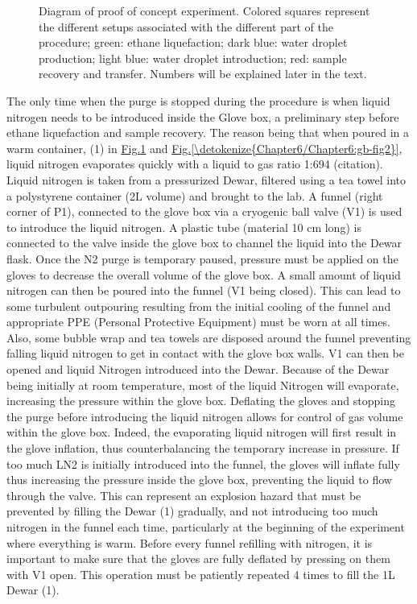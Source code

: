 \documentclass[letterpaper,10pt,english]{jupyterBook}
\begin{document}
\begin{figure}[htbp]
\centering
\capstart

\noindent{}
\caption{Diagram of proof of concept experiment. Colored squares represent the different setups associated with the different part of the procedure; green: ethane liquefaction; dark blue: water droplet production; light blue: water droplet introduction; red: sample recovery and transfer. Numbers will be explained later in the text.}\label{\detokenize{Chapter6/Chapter6:gb-fig1}}\end{figure}

\sphinxAtStartPar
The only time when the purge is stopped during the procedure is when liquid nitrogen needs to be introduced inside the Glove box, a preliminary step before ethane liquefaction and sample recovery. The reason being that when poured in a warm container, (1) in \hyperref[\detokenize{Chapter6/Chapter6:gb-fig1}]{Fig.\@ \ref{\detokenize{Chapter6/Chapter6:gb-fig1}}} and \hyperref[\detokenize{Chapter6/Chapter6:gb-fig2}]{Fig.\@ \ref{\detokenize{Chapter6/Chapter6:gb-fig2}}}, liquid nitrogen evaporates quickly with a liquid to gas ratio 1:694 (citation).
Liquid nitrogen is taken from a pressurized Dewar, filtered using a tea towel into a polystyrene container (2L volume) and brought to the lab. A funnel (right corner of P1), connected to the glove box via a cryogenic ball valve (V1) is used to introduce the liquid nitrogen. A plastic tube (material 10 cm long) is connected to the valve inside the glove box to channel the liquid into the Dewar flask.
Once the N2 purge is temporary paused, pressure must be applied on the gloves to decrease the overall volume of the glove box. A small amount of liquid nitrogen can then be poured into the funnel (V1 being closed). This can lead to some turbulent outpouring resulting from the initial cooling of the funnel and appropriate PPE (Personal Protective Equipment) must be worn at all times. Also, some bubble wrap and tea towels are disposed around the funnel preventing falling liquid nitrogen to get in contact with the glove box walls. V1 can then be opened and liquid Nitrogen introduced into the Dewar. Because of the Dewar being initially at room temperature, most of the liquid Nitrogen will evaporate, increasing the pressure within the glove box. Deflating the gloves and stopping the purge before introducing the liquid nitrogen allows for control of gas volume within the glove box. Indeed, the evaporating liquid nitrogen will first result in the glove inflation, thus counterbalancing the temporary increase in pressure. If too much LN2 is initially introduced into the funnel, the gloves will inflate fully thus increasing the pressure inside the glove box, preventing the liquid to flow through the valve. This can represent an explosion hazard that must be prevented by filling the Dewar (1) gradually, and not introducing too much nitrogen in the funnel each time, particularly at the beginning of the experiment where everything is warm. Before every funnel refilling with nitrogen, it is important to make sure that the gloves are fully deflated by pressing on them with V1 open. This operation must be patiently repeated 4 times to fill the 1L Dewar (1).
\end{document}

